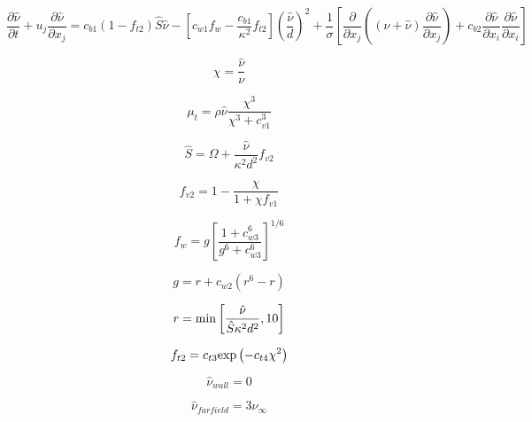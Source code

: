 

\begin{equation}
 \frac{\partial \hat \nu}{\partial t} + u_j \frac{\partial \hat \nu}{\partial x_j} =
    c_{b1}(1-f_{t2})\hat S \hat \nu -
    \left[c_{w1}f_w - \frac{c_{b1}}{\kappa^2}f_{t2}\right]
    \left(\frac{\hat \nu}{d} \right)^2 
  + \frac{1}{\sigma} \left[ \frac{\partial}{\partial x_j}
    \left( \left( \nu + \hat \nu \right) \frac{\partial \hat \nu}{\partial x_j} \right)
    + c_{b2}\frac{\partial \hat \nu}{\partial x_i} \frac{\partial \hat \nu}{\partial x_i}
    \right] 
\label{Eq:saeqn}
\end{equation}

\begin{equation}
\chi = \frac{\hat \nu}{\nu}
\end{equation}

\begin{equation}
\mu_t = \rho \hat \nu \frac{\chi^3}{\chi^3+c_{v1}^3}
\end{equation}

\begin{equation}
\hat S = \Omega + \frac{\hat \nu}{\kappa^2 d^2} f_{v2}
\end{equation}

\begin{equation}
f_{v2} = 1 - \frac{\chi}{1+\chi f_{v1}}
\end{equation}

\begin{equation}
f_w = g \left[ \frac{1+c_{w3}^6}{g^6 + c_{w3}^6} \right]^{1/6}
\end{equation}

\begin{equation}
g = r + c_{w2}(r^6 - r)
\end{equation}

\begin{equation}
r = {\rm min} \left[ \frac{\hat \nu}{\hat S \kappa^2 d^2}, 10 \right]
\end{equation}

\begin{equation}
f_{t2} = c_{t3} {\rm exp} \left( -c_{t4} \chi^2 \right)
\end{equation}

\begin{equation}
\hat \nu_{wall} = 0
\end{equation}

\begin{equation}
\hat \nu_{farfield} = 3 \nu_{\infty}
\end{equation}

